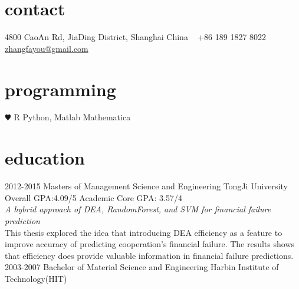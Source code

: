 \documentclass[]{friggeri-cv} %
\begin{document}


\begin{aside} %
\section{contact}
4800 CaoAn Rd,
JiaDing District, Shanghai
China
~
+86 189 1827 8022
~
\href{mailto:zhangfayou@gmail.com}{zhangfayou@gmail.com}
\section{programming}
{\color{red} $\varheartsuit$} R
Python, Matlab Mathematica
\end{aside}


\section{education}

\begin{entrylist}
\entry
{2012-2015}
{Masters {\normalfont of Management Science and Engineering}}
{TongJi University}
{Overall GPA:4.09/5 Academic Core GPA: 3.57/4\\
\emph{A hybrid approach of DEA, RandomForest, and SVM for financial failure prediction} \\ This thesis explored the idea that introducing DEA efficiency as a feature to improve accuracy of predicting cooperation's financial failure. The results shows that efficiency does provide valuable information in financial failure predictions.}
\entry
{2003-2007}
{Bachelor {\normalfont of Material Science and Engineering}}
{Harbin Institute of Technology(HIT)}
{}
\end{entrylist}
\end{document}
